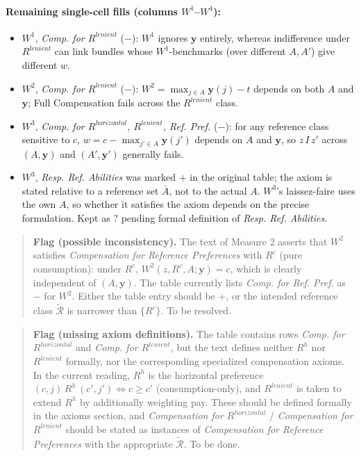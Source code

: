 \documentclass[12pt,thmsb]{article}
\begin{document}
\paragraph{Remaining single-cell fills (columns $W^1$--$W^4$):}
\begin{itemize}
    \item $W^1$, \emph{Comp. for $R^{lenient}$} ($-$): $W^1$ ignores $\mathbf y$ entirely, whereas indifference under $R^{lenient}$ can link bundles whose $W^1$-benchmarks (over different $A,A'$) give different $w$.
    \item $W^2$, \emph{Comp. for $R^{lenient}$} ($-$): $W^2=\max_{j\in A}\mathbf y(j)-t$ depends on both $A$ and $\mathbf y$; Full Compensation fails across the $R^{lenient}$ class.
    \item $W^3$, \emph{Comp. for $R^{horizontal}$, $R^{lenient}$, Ref. Pref.} ($-$): for any reference class sensitive to $c$, $w=c-\max_{j'\in A}\mathbf y(j')$ depends on $A$ and $\mathbf y$, so $z\,I\,z'$ across $(A,\mathbf y)$ and $(A',\mathbf y')$ generally fails.
    \item $W^3$, \emph{Resp. Ref. Abilities} was marked $+$ in the original table; the axiom is stated relative to a reference set $\bar A$, not to the actual $A$. $W^3$'s laissez-faire uses the own $A$, so whether it satisfies the axiom depends on the precise formulation. Kept as $?$ pending formal definition of \emph{Resp. Ref. Abilities}.
\end{itemize}

\begin{quote}
\textbf{Flag (possible inconsistency).} The text of Measure 2 asserts that $W^2$ satisfies \emph{Compensation for Reference Preferences} with $R^c$ (pure consumption): under $R^c$, $W^2(z,R^c,A;\mathbf y)=c$, which is clearly independent of $(A,\mathbf y)$. The table currently lists \emph{Comp. for Ref. Pref.} as $-$ for $W^2$. Either the table entry should be $+$, or the intended reference class $\tilde{\mathcal R}$ is narrower than $\{R^c\}$. To be resolved.
\end{quote}

\begin{quote}
\textbf{Flag (missing axiom definitions).} The table contains rows \emph{Comp. for $R^{horizontal}$} and \emph{Comp. for $R^{lenient}$}, but the text defines neither $R^h$ nor $R^{lenient}$ formally, nor the corresponding specialized compensation axioms. In the current reading, $R^h$ is the horizontal preference $(c,j)\,R^h\,(c',j')\Leftrightarrow c\geq c'$ (consumption-only), and $R^{lenient}$ is taken to extend $R^h$ by additionally weighting pay. These should be defined formally in the axioms section, and \emph{Compensation for $R^{horizontal}$} / \emph{Compensation for $R^{lenient}$} should be stated as instances of \emph{Compensation for Reference Preferences} with the appropriate $\tilde{\mathcal R}$. To be done.
\end{quote}
\end{document}
